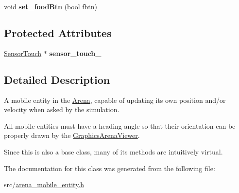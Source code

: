 \begin{DoxyCompactItemize}
\item 
void {\bfseries set\+\_\+food\+Btn} (bool fbtn)\hypertarget{class_arena_mobile_entity_ad2dd0b482ed67685585f056f248b4523}{}\label{class_arena_mobile_entity_ad2dd0b482ed67685585f056f248b4523}

\end{DoxyCompactItemize}
\subsection*{Protected Attributes}
\begin{DoxyCompactItemize}
\item 
\hyperlink{class_sensor_touch}{Sensor\+Touch} $\ast$ {\bfseries sensor\+\_\+touch\+\_\+}\hypertarget{class_arena_mobile_entity_a260fd3fba196ee9ab56f9f2ce6ab4a21}{}\label{class_arena_mobile_entity_a260fd3fba196ee9ab56f9f2ce6ab4a21}

\end{DoxyCompactItemize}


\subsection{Detailed Description}
A mobile entity in the \hyperlink{class_arena}{Arena}, capable of updating its own position and/or velocity when asked by the simulation. 

All mobile entities must have a heading angle so that their orientation can be properly drawn by the \hyperlink{class_graphics_arena_viewer}{Graphics\+Arena\+Viewer}.

Since this is also a base class, many of its methods are intuitively {\ttfamily virtual}. 

The documentation for this class was generated from the following file\+:\begin{DoxyCompactItemize}
\item 
src/\hyperlink{arena__mobile__entity_8h}{arena\+\_\+mobile\+\_\+entity.\+h}\end{DoxyCompactItemize}

